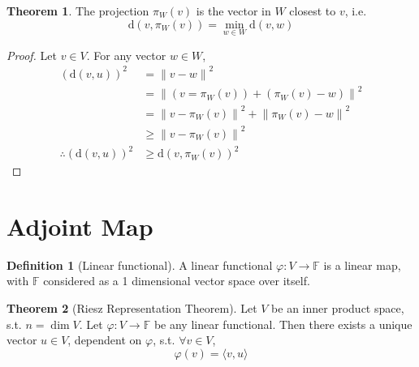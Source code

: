 \documentclass[fleqn, a4paper, 12pt]{article}
\theoremstyle{definition}
\newtheorem{definition}{Definition} %
\theoremstyle{theorem}
\newtheorem{theorem}{Theorem} %
\theoremstyle{remark}
\newcommand{\distance}{\mathrm{d}}
\numberwithin{corollary}{theorem}
\numberwithin{equation}{theorem}
\begin{document}
\begin{theorem}
	The projection $\pi_W(v)$ is the vector in $W$ closest to $v$, i.e.
	\begin{equation*}
		\distance \left( v, \pi_W(v) \right) = \min_{w \in W} \distance(v,w)
	\end{equation*}
\end{theorem}

\begin{proof}
	Let $v \in V$. For any vector $w \in W$,
	\begin{align*}
		\left( \distance(v,u) \right)^2 &= {\| v - w \|}^2\\
		&= \left\| \left( v = \pi_W(v) \right) + \left( \pi_W(v) - w \right) \right\|^2\\
		&= \left\| v - \pi_W(v) \right\|^2 + \left\| \pi_W(v) - w \right\|^2\\
		&\geq \left\| v - \pi_W(v) \right\|^2\\
	\therefore \left( \distance(v,u) \right)^2 &\geq \distance \left( v, \pi_W(v) \right)^2
	\end{align*}
\end{proof}

\section{Adjoint Map}

\begin{definition}[Linear functional]
	A linear functional $\varphi : V \to \mathbb{F}$ is a linear map, with $\mathbb{F}$ considered as a 1 dimensional vector space over itself.
\end{definition}

\begin{theorem}[Riesz Representation Theorem]
	Let $V$ be an inner product space, s.t. $n = \dim V$. Let $\varphi : V \to \mathbb{F}$ be any linear functional. Then there exists a unique vector $u \in V$, dependent on $\varphi$, s.t. $\forall v \in V$,
	\begin{equation*}
		\varphi(v) = \langle v, u \rangle
	\end{equation*}
\end{theorem}
\end{document}
